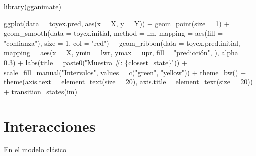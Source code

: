 \documentclass[
  12pt,
]{book}
\newenvironment{Shaded}{\begin{snugshade}}{\end{snugshade}}
\newcommand{\AttributeTok}[1]{\textcolor[rgb]{0.77,0.63,0.00}{#1}}
\newcommand{\DecValTok}[1]{\textcolor[rgb]{0.00,0.00,0.81}{#1}}
\newcommand{\FloatTok}[1]{\textcolor[rgb]{0.00,0.00,0.81}{#1}}
\newcommand{\FunctionTok}[1]{\textcolor[rgb]{0.00,0.00,0.00}{#1}}
\newcommand{\NormalTok}[1]{#1}
\newcommand{\SpecialCharTok}[1]{\textcolor[rgb]{0.00,0.00,0.00}{#1}}
\newcommand{\StringTok}[1]{\textcolor[rgb]{0.31,0.60,0.02}{#1}}
\theoremstyle{definition}
\theoremstyle{definition}
\theoremstyle{definition}
\theoremstyle{remark}
\begin{document}
\begin{Shaded}
\begin{Highlighting}[]
\FunctionTok{library}\NormalTok{(gganimate)}

\FunctionTok{ggplot}\NormalTok{(}\AttributeTok{data =}\NormalTok{ toyex.pred, }\FunctionTok{aes}\NormalTok{(}\AttributeTok{x =}\NormalTok{ X, }\AttributeTok{y =}\NormalTok{ Y)) }\SpecialCharTok{+} \FunctionTok{geom\_point}\NormalTok{(}\AttributeTok{size =} \DecValTok{1}\NormalTok{) }\SpecialCharTok{+} 
    \FunctionTok{geom\_smooth}\NormalTok{(}\AttributeTok{data =}\NormalTok{ toyex.initial, }\AttributeTok{method =}\NormalTok{ lm, }
        \AttributeTok{mapping =} \FunctionTok{aes}\NormalTok{(}\AttributeTok{fill =} \StringTok{"confianza"}\NormalTok{), }\AttributeTok{size =} \DecValTok{1}\NormalTok{, }
        \AttributeTok{col =} \StringTok{"red"}\NormalTok{) }\SpecialCharTok{+} \FunctionTok{geom\_ribbon}\NormalTok{(}\AttributeTok{data =}\NormalTok{ toyex.pred.initial, }
    \AttributeTok{mapping =} \FunctionTok{aes}\NormalTok{(}\AttributeTok{x =}\NormalTok{ X, }\AttributeTok{ymin =}\NormalTok{ lwr, }\AttributeTok{ymax =}\NormalTok{ upr, }\AttributeTok{fill =} \StringTok{"predicción"}\NormalTok{, }
\NormalTok{        ), }\AttributeTok{alpha =} \FloatTok{0.3}\NormalTok{) }\SpecialCharTok{+} \FunctionTok{labs}\NormalTok{(}\AttributeTok{title =} \FunctionTok{paste0}\NormalTok{(}\StringTok{"Muestra \#: \{closest\_state\}"}\NormalTok{)) }\SpecialCharTok{+} 
    \FunctionTok{scale\_fill\_manual}\NormalTok{(}\StringTok{"Intervalos"}\NormalTok{, }\AttributeTok{values =} \FunctionTok{c}\NormalTok{(}\StringTok{"green"}\NormalTok{, }
        \StringTok{"yellow"}\NormalTok{)) }\SpecialCharTok{+} \FunctionTok{theme\_bw}\NormalTok{() }\SpecialCharTok{+} \FunctionTok{theme}\NormalTok{(}\AttributeTok{axis.text =} \FunctionTok{element\_text}\NormalTok{(}\AttributeTok{size =} \DecValTok{20}\NormalTok{), }
    \AttributeTok{axis.title =} \FunctionTok{element\_text}\NormalTok{(}\AttributeTok{size =} \DecValTok{20}\NormalTok{)) }\SpecialCharTok{+} \FunctionTok{transition\_states}\NormalTok{(im)}
\end{Highlighting}
\end{Shaded}

\hypertarget{interacciones}{%
\section{Interacciones}\label{interacciones}}

En el modelo clásico
\end{document}
